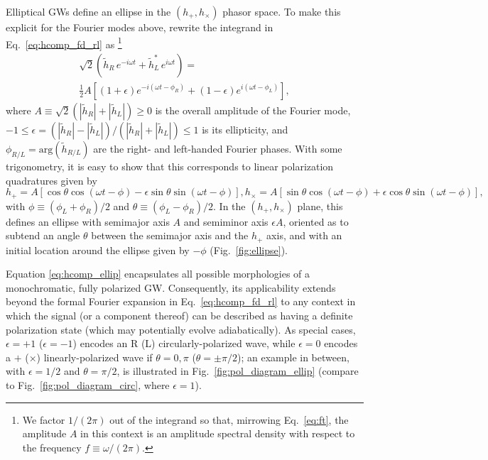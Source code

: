 \documentclass[aps,prd,twocolumn,superscriptaddress,preprintnumbers,floatfix,nofootinbib]{revtex4-2}
\newcommand{\beq}{\begin{equation}}
\newcommand{\eeq}{\end{equation}}
\newcommand*{\eq}[1]{Eq.~\eqref{eq:#1}}
\begin{document}
Elliptical GWs define an ellipse in the $\left(h_+, h_\times\right)$ phasor space.
To make this explicit for the Fourier modes above, rewrite the integrand in Eq.~\eqref{eq:hcomp_fd_rl} as%
\footnote{We factor $1/(2\pi)$ out of the integrand so that, mirrowing Eq.~\eqref{eq:ft}, the amplitude $A$ in this context is an amplitude spectral density with respect to the frequency $f \equiv \omega/(2\pi)$.}
\begin{align}
\sqrt{2} \left(\tilde{h}_R\, e^{-i \omega t} + \tilde{h}_L^*\, e^{i \omega t}\right) =\nonumber\\
\frac{1}{2}A\left[ \left(1+\epsilon\right) e^{-i (\omega t - \phi_R)} + \left(1-\epsilon\right) e^{i (\omega t - \phi_L)} \right],
\end{align}
where
$A \equiv \sqrt{2} \left(|\tilde{h}_R| + |\tilde{h}_L| \right) \geq 0$ is the overall amplitude of the Fourier mode, $-1 \leq \epsilon = (|\tilde{h}_R| - |\tilde{h}_L|)/(|\tilde{h}_R| + |\tilde{h}_L|) \leq 1$ is its ellipticity, and $\phi_{R/L} = \mathrm{arg}(\tilde{h}_{R/L})$ are the right- and left-handed Fourier phases.
With some trigonometry, it is easy to show that this corresponds to linear polarization quadratures given by
\begin{subequations} \label{eq:hcomp_ellip}
\beq
h_+ = A \left[\cos \theta \cos(\omega t - \phi) - \epsilon \sin \theta \sin(\omega t - \phi)\right] ,
\eeq
\beq
h_\times = A \left[\sin \theta \cos(\omega t - \phi) + \epsilon \cos \theta \sin(\omega t - \phi)\right] ,
\eeq
\end{subequations}
with $\phi \equiv (\phi_L + \phi_R)/2$ and $\theta \equiv (\phi_L - \phi_R)/2$. 
In the $\left(h_+,h_\times\right)$ plane, this defines an ellipse with semimajor axis $A$ and semiminor axis $\epsilon A$, oriented as to subtend an angle $\theta$ between the semimajor axis and the $h_+$ axis, and with an initial location around the ellipse given by $-\phi$ (Fig.~\ref{fig:ellipse}).

Equation \eqref{eq:hcomp_ellip} encapsulates all possible morphologies of a monochromatic, fully polarized GW.
Consequently, its applicability extends beyond the formal Fourier expansion in \eq{hcomp_fd_rl} to any context in which the signal (or a component thereof) can be described as having a definite polarization state (which may potentially evolve adiabatically).
As special cases, $\epsilon = +1$ ($\epsilon = -1$) encodes an R (L) circularly-polarized wave, while $\epsilon =0$ encodes a $+$ ($\times$) linearly-polarized wave if $\theta = 0,\pi$ ($\theta = \pm \pi/2$);
an example in between, with $\epsilon=1/2$ and $\theta = \pi/2$, is illustrated in Fig.~\ref{fig:pol_diagram_ellip} (compare to Fig.~\ref{fig:pol_diagram_circ}, where $\epsilon=1$).
\end{document}
